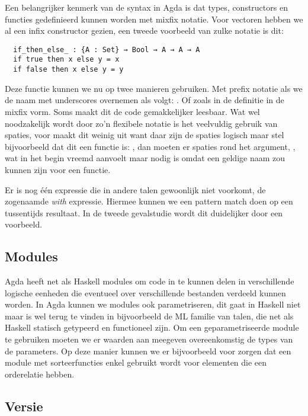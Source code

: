 Een belangrijker kenmerk van de syntax in Agda is dat types, constructors en
functies gedefinieerd kunnen worden met mixfix notatie. Voor vectoren hebben we
al een infix constructor gezien, een tweede voorbeeld van zulke notatie is dit:

\begin{verbatim}
  if_then_else_ : {A : Set} → Bool → A → A → A
  if true then x else y = x
  if false then x else y = y
\end{verbatim}

Deze functie kunnen we nu op twee manieren gebruiken. Met prefix notatie als we
de naam met underscores overnemen als volgt: . Of
zoals in de definitie in de mixfix vorm. Soms maakt dit de code gemakkelijker
leesbaar. Wat wel noodzakelijk wordt door zo'n flexibele notatie is het
veelvuldig gebruik van spaties, voor  maakt dit weinig uit
want daar zijn de spaties logisch maar stel bijvoorbeeld dat dit een functie
is: \iagda{[_]}, dan moeten er spaties rond het argument, \iagda{[ x ]}, wat in
het begin vreemd aanvoelt maar nodig is omdat \iagda{[x]} een geldige naam zou
kunnen zijn voor een functie.

Er is nog één expressie die in andere talen gewoonlijk niet voorkomt, de
zogenaamde \emph{with} expressie. Hiermee kunnen we een pattern match doen op
een tussentijds resultaat. In de tweede gevalstudie wordt dit duidelijker door
een voorbeeld.

\subsection{Modules}

Agda heeft net als Haskell modules om code in te kunnen delen in verschillende
logische eenheden die eventueel over verschillende bestanden verdeeld kunnen
worden. In Agda kunnen we modules ook parametriseren, dit gaat in Haskell niet
maar is wel terug te vinden in bijvoorbeeld de ML \cite{sml} \cite{ocaml} familie
van talen, die net als Haskell statisch getypeerd en functioneel zijn. Om een
geparametriseerde module te gebruiken moeten we er waarden aan meegeven
overeenkomstig de types van de parameters. Op deze manier kunnen we er
bijvoorbeeld voor zorgen dat een module met sorteerfuncties enkel gebruikt
wordt voor elementen die een orderelatie hebben.

\subsection{Versie}

